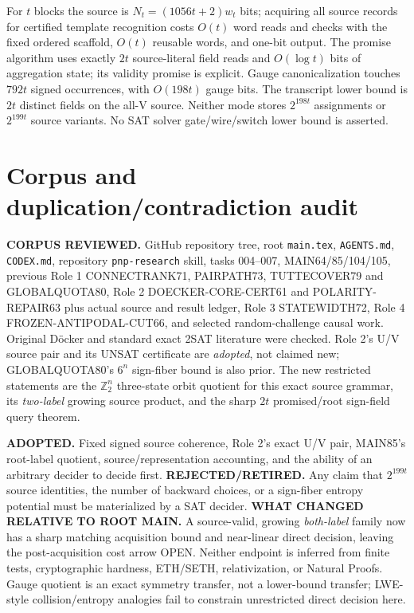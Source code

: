 \documentclass[11pt]{article}
\begin{document}
For $t$ blocks the source is $N_t=(1056t+2)w_t$ bits; acquiring all source records for certified template recognition costs $O(t)$ word reads and checks with the fixed ordered scaffold, $O(t)$ reusable words, and one-bit output. The promise algorithm uses exactly $2t$ source-literal field reads and $O(\log t)$ bits of aggregation state; its validity promise is explicit. Gauge canonicalization touches $792t$ signed occurrences, with $O(198t)$ gauge bits. The transcript lower bound is $2t$ distinct fields on the all-V source. Neither mode stores $2^{198t}$ assignments or $2^{199t}$ source variants. No SAT solver gate/wire/switch lower bound is asserted.

\section{Corpus and duplication/contradiction audit}
\textbf{CORPUS REVIEWED.} GitHub repository tree, root \texttt{main.tex}, \texttt{AGENTS.md}, \texttt{CODEX.md}, repository \texttt{pnp-research} skill, tasks 004--007, MAIN64/85/104/105, previous Role 1 CONNECTRANK71, PAIRPATH73, TUTTECOVER79 and GLOBALQUOTA80, Role 2 DOECKER-CORE-CERT61 and POLARITY-REPAIR63 plus actual source and result ledger, Role 3 STATEWIDTH72, Role 4 FROZEN-ANTIPODAL-CUT66, and selected random-challenge causal work. Original D\"ocker and standard exact 2SAT literature were checked. Role 2's U/V source pair and its UNSAT certificate are \emph{adopted}, not claimed new; GLOBALQUOTA80's $6^n$ sign-fiber bound is also prior. The new restricted statements are the $\mathbb Z_2^n$ three-state orbit quotient for this exact source grammar, its \emph{two-label} growing source product, and the sharp $2t$ promised/root sign-field query theorem.

\textbf{ADOPTED.} Fixed signed source coherence, Role 2's exact U/V pair, MAIN85's root-label quotient, source/representation accounting, and the ability of an arbitrary decider to decide first. \textbf{REJECTED/RETIRED.} Any claim that $2^{199t}$ source identities, the number of backward choices, or a sign-fiber entropy potential must be materialized by a SAT decider. \textbf{WHAT CHANGED RELATIVE TO ROOT MAIN.} A source-valid, growing \emph{both-label} family now has a sharp matching acquisition bound and near-linear direct decision, leaving the post-acquisition cost arrow OPEN. Neither endpoint is inferred from finite tests, cryptographic hardness, ETH/SETH, relativization, or Natural Proofs. Gauge quotient is an exact symmetry transfer, not a lower-bound transfer; LWE-style collision/entropy analogies fail to constrain unrestricted direct decision here.
\end{document}
